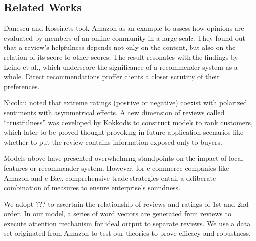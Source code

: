 \documentclass[12pt]{article}%
\begin{document}
\subsection{Related Works}

Danescu and Kossinets \cite{232}took Amazon as an example to assess how opinions are evaluated by members of an online community in a large scale. They found out that a review’s helpfulness depends not only on the content, but also on the relation of its score to other scores. The result resonates with the findings by Leino et al.\cite{236}, which underscore the significance of a recommender system as a whole. Direct recommendations proffer clients a closer scrutiny of their preferences.

Nicolau \cite{233} noted that extreme ratings (positive or negative) coexist with polarized sentiments with asymmetrical effects. A new dimension of reviews called “trustfulness” was developed by Kokkodis \cite{234} to construct models to rank customers, which later to be proved thought-provoking in future application scenarios like whether to put the review contains information exposed only to buyers. 

Models above have presented overwhelming standpoints on the impact of local features or recommender system. However, for e-commerce companies like Amazon and e-Bay, comprehensive trade strategies entail a deliberate combination of measures to ensure enterprise’s soundness.

We adopt ??? to ascertain the relationship of reviews and ratings of 1st and 2nd order. In our model, a series of word vectors are generated from reviews to execute attention mechanism for ideal output to separate reviews. We use a data set originated from Amazon to test our theories to prove efficacy and robustness.
	
\end{document}
